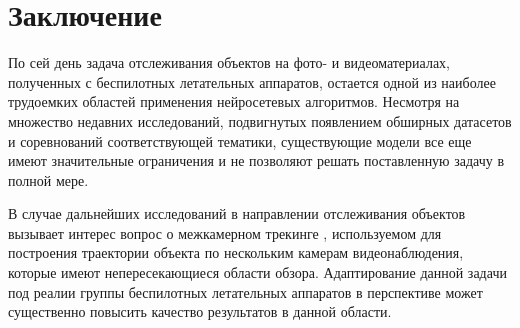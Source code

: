 \section*{Заключение}

По сей день задача отслеживания объектов на фото- и видеоматериалах, полученных с беспилотных летательных аппаратов, остается одной из наиболее трудоемких областей применения нейросетевых алгоритмов. Несмотря на множество недавних исследований, подвигнутых появлением обширных датасетов и соревнований соответствующей тематики, существующие модели все еще имеют значительные ограничения и не позволяют решать поставленную задачу в полной мере.

В случае дальнейших исследований в направлении отслеживания объектов вызывает интерес вопрос о межкамерном трекинге \cite{16-1}, используемом для построения траектории объекта по нескольким камерам видеонаблюдения, которые имеют непересекающиеся области обзора. Адаптирование данной задачи под реалии группы беспилотных летательных аппаратов \cite{16-2} в перспективе может существенно повысить качество результатов в данной области.
